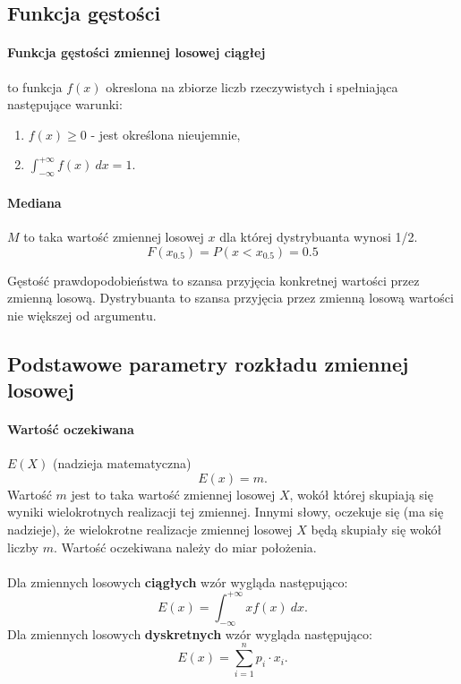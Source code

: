 \documentclass[a4paper,twoside]{report}
\begin{document}
\subsection{Funkcja gęstości}

\paragraph{Funkcja gęstości zmiennej losowej ciągłej} to funkcja $f(x)$ okreslona na zbiorze liczb rzeczywistych i spełniająca następujące warunki:

\begin{enumerate}
\item $f(x) \ge 0$ - jest określona nieujemnie,
\item $ \int_{-\infty}^{+ \infty} f(x)~dx = 1$.
\end{enumerate}

\paragraph{Mediana} $M$ to taka wartość zmiennej losowej $x$ dla której dystrybuanta wynosi 1/2.
\begin{equation}
F(x_{0.5}) = P(x < x_{0.5}) = 0.5
\end{equation}


Gęstość prawdopodobieństwa to szansa przyjęcia konkretnej wartości
przez zmienną losową. Dystrybuanta to szansa przyjęcia przez zmienną
losową wartości nie większej od argumentu.

\subsection{Podstawowe parametry rozkładu zmiennej losowej}
\paragraph{Wartość oczekiwana} $E(X)$ (nadzieja matematyczna)
\begin{equation}
E(x) = m.
\end{equation}
Wartość $m$ jest to taka wartość zmiennej losowej $X$, wokół której skupiają się
wyniki wielokrotnych realizacji tej zmiennej. Innymi słowy, oczekuje się (ma
się nadzieje), że wielokrotne realizacje zmiennej losowej $X$ będą skupiały się
wokół liczby $m$. Wartość oczekiwana należy do miar położenia. \\\\
Dla zmiennych losowych \textbf{ciągłych} wzór wygląda następująco:
\begin{equation}
E(x) = \int_{-\infty}^{+ \infty} xf(x)~dx.
\end{equation}
Dla zmiennych losowych \textbf{dyskretnych} wzór wygląda następująco:
\begin{equation}
E(x) = \sum_{i=1}^{n} p_i \cdot x_i.
\end{equation}
\medskip
\end{document}
